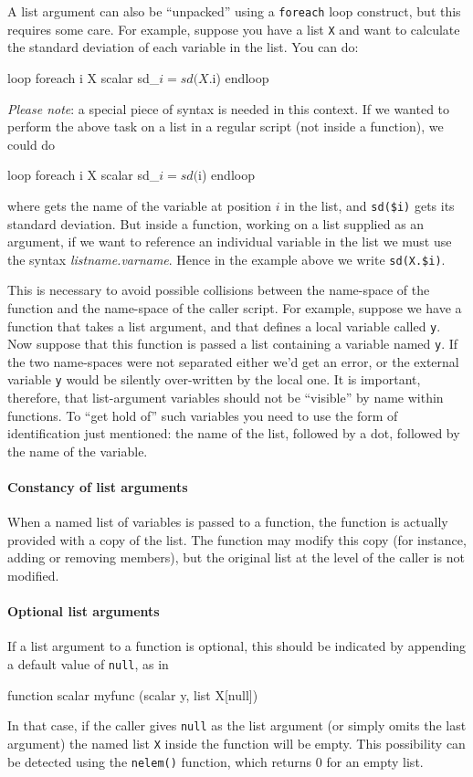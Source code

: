 A list argument can also be ``unpacked'' using a \texttt{foreach} loop
construct, but this requires some care.  For example, suppose you have
a list \texttt{X} and want to calculate the standard deviation of each
variable in the list.  You can do:
%
\begin{code}
loop foreach i X
   scalar sd_$i = sd(X.$i)
endloop
\end{code}

\textit{Please note}: a special piece of syntax is needed in this
context.  If we wanted to perform the above task on a list in a
regular script (not inside a function), we could do
%
\begin{code}
loop foreach i X
   scalar sd_$i = sd($i)
endloop
\end{code}
%
where  gets the name of the variable at position $i$ in the
list, and \verb|sd($i)| gets its standard deviation.  But inside a
function, working on a list supplied as an argument, if we want to
reference an individual variable in the list we must use the syntax
\textsl{listname.varname}.  Hence in the example above we write
\verb|sd(X.$i)|.

This is necessary to avoid possible collisions between the name-space
of the function and the name-space of the caller script.  For example,
suppose we have a function that takes a list argument, and that
defines a local variable called \texttt{y}.  Now suppose that this
function is passed a list containing a variable named \texttt{y}.  If
the two name-spaces were not separated either we'd get an error, or
the external variable \texttt{y} would be silently over-written by the
local one.  It is important, therefore, that list-argument variables
should not be ``visible'' by name within functions.  To ``get hold
of'' such variables you need to use the form of identification just
mentioned: the name of the list, followed by a dot, followed by the
name of the variable.

\paragraph{Constancy of list arguments} When a named list of
variables is passed to a function, the function is actually provided
with a copy of the list.  The function may modify this copy (for
instance, adding or removing members), but the original list at the
level of the caller is not modified.

\paragraph{Optional list arguments} If a list argument to a function is
optional, this should be indicated by appending a default value of
\texttt{null}, as in
%
\begin{code}
function scalar myfunc (scalar y, list X[null])
\end{code}
%
In that case, if the caller gives \texttt{null} as the list argument
(or simply omits the last argument) the named list \texttt{X} inside the
function will be empty.  This possibility can be detected using the
\texttt{nelem()} function, which returns 0 for an empty list.


